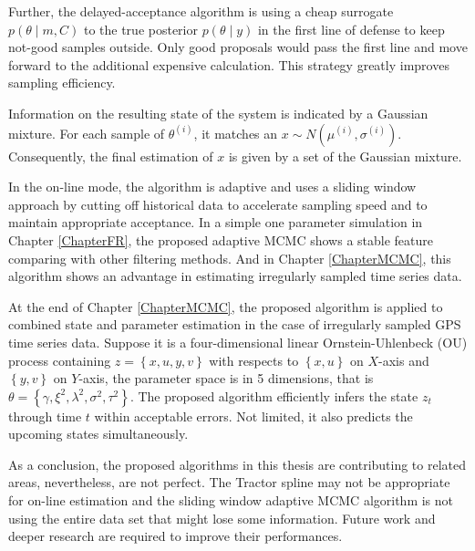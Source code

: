 Further, the delayed-acceptance algorithm is using a cheap surrogate $p(\theta\mid m, C)$ to the true posterior $p(\theta\mid y)$ in the first line of defense to keep not-good samples outside. Only good proposals would pass the first line and move forward to the additional expensive calculation. This strategy greatly improves sampling efficiency. 

Information on the resulting state of the system is indicated by a Gaussian mixture. For each sample of $\theta^{(i)}$, it matches an $x \sim N\left(\mu^{(i)},\sigma^{(i)}\right)$. Consequently, the final estimation of $x$ is given by a set of the Gaussian mixture. 

In the on-line mode, the algorithm is adaptive and uses a sliding window approach by cutting off historical data to accelerate sampling speed and to maintain appropriate acceptance. In a simple one parameter simulation in Chapter \ref{ChapterFR}, the proposed adaptive MCMC shows a stable feature comparing with other filtering methods. And in Chapter \ref{ChapterMCMC}, this algorithm shows an advantage in estimating irregularly sampled time series data. 

At the end of Chapter \ref{ChapterMCMC}, the proposed algorithm is applied to combined state and parameter estimation in the case of irregularly sampled GPS time series data. Suppose it is a four-dimensional linear Ornstein-Uhlenbeck (OU) process containing $z=\left\lbrace x,u,y,v\right\rbrace$ with respects to $\left\lbrace x,u\right\rbrace$ on $X$-axis and $\left\lbrace y,v\right\rbrace$ on $Y$-axis, the parameter space is in 5 dimensions, that is $\theta=\left\lbrace\gamma,\xi^2,\lambda^2,\sigma^2,\tau^2\right\rbrace$. The proposed algorithm efficiently infers the state $z_t$ through time $t$ within acceptable errors. Not limited, it also predicts the upcoming states simultaneously. 

As a conclusion, the proposed algorithms in this thesis are contributing to related areas, nevertheless, are not perfect. The Tractor spline may not be appropriate for on-line estimation and the sliding window adaptive MCMC algorithm is not using the entire data set that might lose some information. Future work and deeper research are required to improve their performances. 
